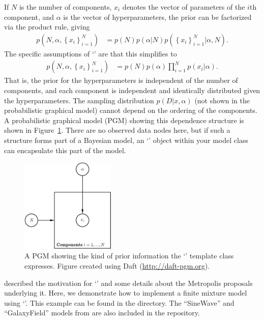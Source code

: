 \documentclass[article]{jss}
\begin{document}
If $N$ is the number of components, $x_i$ denotes the vector of parameters
of the $i$th component, and $\alpha$ is the vector of hyperparameters, the prior
can be factorized via the product rule, giving
\begin{align*}
p\left(N, \alpha, \left\{x_i\right\}_{i=1}^N\right)
&= p(N)p(\alpha | N)p\left(\left\{x_i\right\}_{i=1}^N | \alpha, N\right).
\end{align*}
The specific assumptions of `' are that this simplifies to
\begin{align}
p\left(N, \alpha, \left\{x_i\right\}_{i=1}^N\right)
&= p(N)p(\alpha)
\prod_{i=1}^N
p\left(x_i | \alpha\right).\label{eqn:rjobject}
\end{align}
That is, the prior for the hyperparameters is independent of the number of
components, and each component is independent and identically
distributed given the hyperparameters. The sampling distribution
$p(D | x, \alpha)$ (not shown in the probabilistic graphical model)
cannot depend on the ordering of the components.
A probabilistic graphical model (PGM) showing this dependence
structure is shown in Figure~\ref{fig:rjobject_pgm}. There are no observed
data nodes here, but if such a structure forms part of a
Bayesian model, an `' object within your model class
can encapsulate this part of the model.

\begin{figure}[t!]
\centering
\includegraphics[width=0.4\textwidth]{rjobject_pgm.pdf}
\caption{A PGM showing the kind of prior information the `'
template class expresses.
Figure created using Daft (\url{http://daft-pgm.org}).\label{fig:rjobject_pgm}}
\end{figure}

\citet{brewer2014inference}
described the motivation for `' and some details
about the Metropolis proposals underlying it. Here, we demonstrate how to
implement a finite mixture model using `'.
This example can be found in the
directory. The ``SineWave'' and ``GalaxyField'' models
from \citet{brewer2014inference}
are also included in the  repository.
\end{document}
